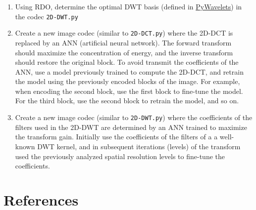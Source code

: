 \begin{enumerate}
\item Using RDO, determine the optimal DWT basis (defined in
  \href{https://pywavelets.readthedocs.io/en/latest/}{PyWavelets}) in
  the codec \texttt{2D-DWT.py}
\item Create a new image codec (similar to \texttt{2D-DCT.py}) where
  the 2D-DCT is replaced by an ANN (artificial neural network). The
  forward transform should maximize the concentration of energy, and
  the inverse transform should restore the original block. To avoid
  transmit the coefficients of the ANN, use a model previously trained
  to compute the 2D-DCT, and retrain the model using the previously
  encoded blocks of the image. For example, when encoding the second
  block, use the first block to fine-tune the model. For the third
  block, use the second block to retrain the model, and so on.
\item Create a new image codec (similar to \texttt{2D-DWT.py}) where
  the coefficients of the filters used in the 2D-DWT are determined by
  an ANN trained to maximize the transform gain. Initially use the
  coefficients of the filters of a a well-known DWT kernel, and in
  subsequent iterations (levels) of the transform used the previously
  analyzed spatial resolution levels to fine-tune the coefficients.
\end{enumerate}


\section{References}

\renewcommand{\addcontentsline}[3]{}%



